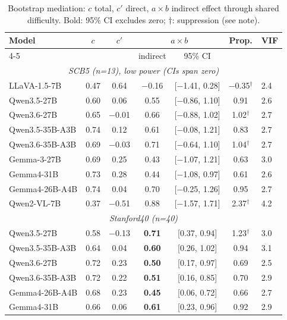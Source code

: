 \documentclass[a4paper,fleqn]{cas-sc}
\begin{document}
\begin{table}[h]
\centering
\caption{Bootstrap mediation: $c$ total, $c'$ direct, $a\times b$ indirect effect through shared difficulty. Bold: 95\% CI excludes zero; $\dagger$: suppression (see note).}
\label{tab:mediation}
\small
\begin{tabular}{lcccccl}
\toprule
\multirow{2}{*}{Model} & \multirow{2}{*}{$c$} & \multirow{2}{*}{$c'$} & \multicolumn{2}{c}{$a\times b$} & \multirow{2}{*}{Prop.} & \multirow{2}{*}{VIF} \\
\cmidrule{4-5}
& & & indirect & 95\% CI & & \\
\midrule
\multicolumn{7}{c}{\textit{SCB5 (n=13), low power (CIs span zero)}} \\
\midrule
LLaVA-1.5-7B & 0.47 & 0.64 & $-$0.16 & [$-$1.41, 0.28] & $-$0.35$^{\dagger}$ & 2.4 \\
Qwen3.5-27B  & 0.60 & 0.06 & 0.55 & [$-$0.86, 1.10] & 0.91 & 2.6 \\
Qwen3.6-27B  & 0.65 & $-$0.01 & 0.66 & [$-$0.88, 1.02] & 1.02$^{\dagger}$ & 2.7 \\
Qwen3.5-35B-A3B  & 0.74 & 0.12 & 0.61 & [$-$0.08, 1.21] & 0.83 & 2.7 \\
Qwen3.6-35B-A3B  & 0.69 & $-$0.03 & 0.71 & [$-$0.64, 1.10] & 1.04$^{\dagger}$ & 2.7 \\
Gemma-3-27B  & 0.69 & 0.25 & 0.43 & [$-$1.07, 1.21] & 0.63 & 3.0 \\
Gemma4-31B   & 0.73 & 0.28 & 0.44 & [$-$1.08, 0.97] & 0.61 & 2.6 \\
Gemma4-26B-A4B   & 0.74 & 0.04 & 0.70 & [$-$0.25, 1.26] & 0.95 & 2.7 \\
Qwen2-VL-7B  & 0.37 & $-$0.51 & 0.88 & [$-$1.57, 1.71] & 2.37$^{\dagger}$ & 4.2 \\
\midrule
\multicolumn{7}{c}{\textit{Stanford40 (n=40)}} \\
\midrule
Qwen3.5-27B       & 0.58 & $-$0.13 & \textbf{0.71} & [0.37, 0.94] & 1.23$^{\dagger}$ & 3.0 \\
Qwen3.5-35B-A3B   & 0.64 & 0.04 & \textbf{0.60} & [0.26, 1.02] & 0.94 & 3.1 \\
Qwen3.6-27B       & 0.72 & 0.23 & \textbf{0.50} & [0.17, 0.97] & 0.69 & 2.5 \\
Qwen3.6-35B-A3B   & 0.72 & 0.22 & \textbf{0.51} & [0.16, 0.85] & 0.70 & 2.9 \\
Gemma4-26B-A4B    & 0.68 & 0.23 & \textbf{0.45} & [0.06, 0.72] & 0.66 & 2.7 \\
Gemma4-31B        & 0.66 & 0.06 & \textbf{0.61} & [0.23, 0.96] & 0.92 & 2.9 \\
\bottomrule
\end{tabular}


\end{table}
\end{document}
